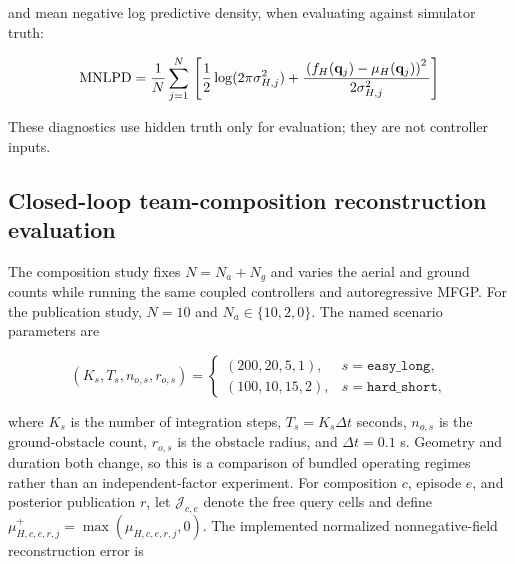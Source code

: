 \documentclass[11pt]{article}
\begin{document}
and mean negative log predictive density, when evaluating against simulator truth:


\begin{equation}
\mathrm{MNLPD} \\
= \\
\frac{1}{N} \\
\sum_{j=1}^{N} \\
\left[ \\
\frac{1}{2}\log(2\pi\sigma_{H,j}^2) \\
+ \\
\frac{ \\
\left(f_H(\mathbf q_j)-\mu_H(\mathbf q_j)\right)^2 \\
}{ \\
2\sigma_{H,j}^2 \\
} \\
\right]
\end{equation}


These diagnostics use hidden truth only for evaluation; they are not controller inputs.


\subsection{Closed-loop team-composition reconstruction evaluation}


The composition study fixes $N=N_a+N_g$ and varies the aerial and ground
counts while running the same coupled controllers and autoregressive MFGP. For
the publication study, $N=10$ and $N_a\in\{10,2,0\}$. The named scenario
parameters are


\begin{equation}
(K_s,T_s,n_{o,s},r_{o,s})
=
\begin{cases}
(200,20,5,1), & s=\texttt{easy\_long},\\
(100,10,15,2), & s=\texttt{hard\_short},
\end{cases}
\end{equation}


where $K_s$ is the number of integration steps, $T_s=K_s\Delta t$ seconds,
$n_{o,s}$ is the ground-obstacle count, $r_{o,s}$ is the obstacle radius, and
$\Delta t=0.1$ s. Geometry and duration both change, so this is a comparison
of bundled operating regimes rather than an independent-factor experiment. For
composition $c$, episode $e$, and posterior publication $r$, let
$\mathcal J_{c,e}$ denote the free query cells and define
$\mu^+_{H,c,e,r,j}=\max(\mu_{H,c,e,r,j},0)$. The implemented normalized
nonnegative-field reconstruction error is
\end{document}
